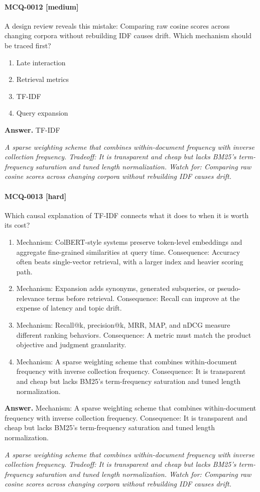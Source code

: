\paragraph{MCQ-0012 [medium]} A design review reveals this mistake: Comparing raw cosine scores across changing corpora without rebuilding IDF causes drift. Which mechanism should be traced first?
\begin{enumerate}[label=\Alph*.]
\item Late interaction
\item Retrieval metrics
\item TF-IDF
\item Query expansion
\end{enumerate}
\noindent\textbf{Answer.} TF-IDF
\par\textit{A sparse weighting scheme that combines within-document frequency with inverse collection frequency. Tradeoff: It is transparent and cheap but lacks BM25's term-frequency saturation and tuned length normalization. Watch for: Comparing raw cosine scores across changing corpora without rebuilding IDF causes drift.}
\paragraph{MCQ-0013 [hard]} Which causal explanation of TF-IDF connects what it does to when it is worth its cost?
\begin{enumerate}[label=\Alph*.]
\item Mechanism: ColBERT-style systems preserve token-level embeddings and aggregate fine-grained similarities at query time. Consequence: Accuracy often beats single-vector retrieval, with a larger index and heavier scoring path.
\item Mechanism: Expansion adds synonyms, generated subqueries, or pseudo-relevance terms before retrieval. Consequence: Recall can improve at the expense of latency and topic drift.
\item Mechanism: Recall@k, precision@k, MRR, MAP, and nDCG measure different ranking behaviors. Consequence: A metric must match the product objective and judgment granularity.
\item Mechanism: A sparse weighting scheme that combines within-document frequency with inverse collection frequency. Consequence: It is transparent and cheap but lacks BM25's term-frequency saturation and tuned length normalization.
\end{enumerate}
\noindent\textbf{Answer.} Mechanism: A sparse weighting scheme that combines within-document frequency with inverse collection frequency. Consequence: It is transparent and cheap but lacks BM25's term-frequency saturation and tuned length normalization.
\par\textit{A sparse weighting scheme that combines within-document frequency with inverse collection frequency. Tradeoff: It is transparent and cheap but lacks BM25's term-frequency saturation and tuned length normalization. Watch for: Comparing raw cosine scores across changing corpora without rebuilding IDF causes drift.}
